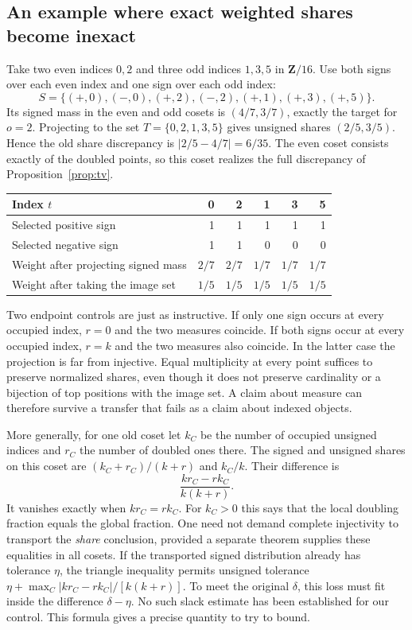 \documentclass[12pt,letterpaper]{article}
\begin{document}
\subsection{An example where exact weighted shares become inexact}
Take two even indices $0,2$ and three odd indices $1,3,5$ in $\mathbf Z/16$. Use both signs over each even index and one sign over each odd index:
\[
 S=\{(+,0),(-,0),(+,2),(-,2),(+,1),(+,3),(+,5)\}.
\]
Its signed mass in the even and odd cosets is $(4/7,3/7)$, exactly the target for $o=2$. Projecting to the set $T=\{0,2,1,3,5\}$ gives unsigned shares $(2/5,3/5)$. Hence the old share discrepancy is $|2/5-4/7|=6/35$. The even coset consists exactly of the doubled points, so this coset realizes the full discrepancy of Proposition~\ref{prop:tv}.

\begin{center}\small
\begin{tabular}{@{}lrrrrr@{}}\toprule
Index $t$ &0&2&1&3&5\\\midrule
Selected positive sign &1&1&1&1&1\\
Selected negative sign &1&1&0&0&0\\
Weight after projecting signed mass & $2/7$&$2/7$&$1/7$&$1/7$&$1/7$\\
Weight after taking the image set & $1/5$&$1/5$&$1/5$&$1/5$&$1/5$\\\bottomrule
\end{tabular}\end{center}

Two endpoint controls are just as instructive. If only one sign occurs at every occupied index, $r=0$ and the two measures coincide. If both signs occur at every occupied index, $r=k$ and the two measures also coincide. In the latter case the projection is far from injective. Equal multiplicity at every point suffices to preserve normalized shares, even though it does not preserve cardinality or a bijection of top positions with the image set. A claim about measure can therefore survive a transfer that fails as a claim about indexed objects.

More generally, for one old coset let $k_C$ be the number of occupied unsigned indices and $r_C$ the number of doubled ones there. The signed and unsigned shares on this coset are $(k_C+r_C)/(k+r)$ and $k_C/k$. Their difference is
\[
      \frac{k r_C-r k_C}{k(k+r)} .
\]
It vanishes exactly when $k r_C=r k_C$. For $k_C>0$ this says that the local doubling fraction equals the global fraction. One need not demand complete injectivity to transport the \emph{share} conclusion, provided a separate theorem supplies these equalities in all cosets. If the transported signed distribution already has tolerance $\eta$, the triangle inequality permits unsigned tolerance $\eta+\max_C |k r_C-r k_C|/[k(k+r)]$. To meet the original $\delta$, this loss must fit inside the difference $\delta-\eta$. No such slack estimate has been established for our control. This formula gives a precise quantity to try to bound.
\end{document}
